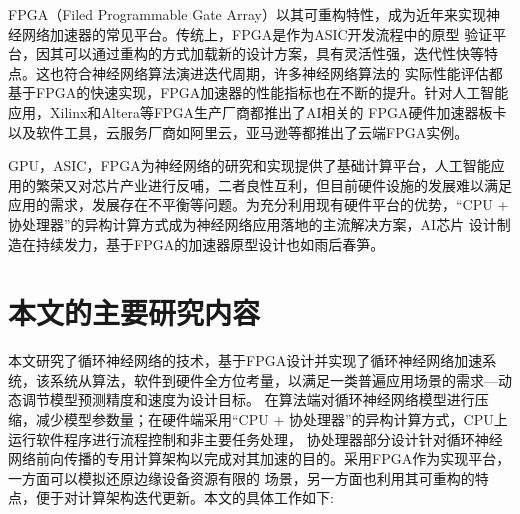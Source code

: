 FPGA（Filed Programmable Gate Array）以其可重构特性，成为近年来实现神经网络加速器的常见平台。传统上，FPGA是作为ASIC开发流程中的原型
验证平台，因其可以通过重构的方式加载新的设计方案，具有灵活性强，迭代性快等特点。这也符合神经网络算法演进迭代周期，许多神经网络算法的
实际性能评估都基于FPGA的快速实现，FPGA加速器的性能指标也在不断的提升。针对人工智能应用，Xilinx和Altera等FPGA生产厂商都推出了AI相关的
FPGA硬件加速器板卡以及软件工具，云服务厂商如阿里云，亚马逊等都推出了云端FPGA实例。

GPU，ASIC，FPGA为神经网络的研究和实现提供了基础计算平台，人工智能应用的繁荣又对芯片产业进行反哺，二者良性互利，但目前硬件设施的发展难以满足
应用的需求，发展存在不平衡等问题。为充分利用现有硬件平台的优势，“CPU + 协处理器”的异构计算方式成为神经网络应用落地的主流解决方案，AI芯片
设计制造在持续发力，基于FPGA的加速器原型设计也如雨后春笋。
\section{本文的主要研究内容}
本文研究了循环神经网络的技术，基于FPGA设计并实现了循环神经网络加速系统，该系统从算法，软件到硬件全方位考量，以满足一类普遍应用场景的需求---动态调节模型预测精度和速度为设计目标。
在算法端对循环神经网络模型进行压缩，减少模型参数量；在硬件端采用“CPU + 协处理器”的异构计算方式，CPU上运行软件程序进行流程控制和非主要任务处理，
协处理器部分设计针对循环神经网络前向传播的专用计算架构以完成对其加速的目的。采用FPGA作为实现平台，一方面可以模拟还原边缘设备资源有限的
场景，另一方面也利用其可重构的特点，便于对计算架构迭代更新。本文的具体工作如下:

